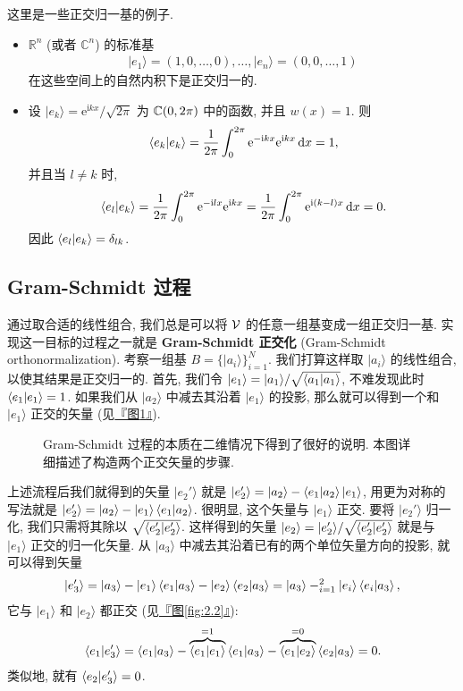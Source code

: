 \documentclass[lang=cn,zihao=-4,twoside,fontset=none]{textbook}
\let\sum\relax
\newcommand{\overnote}[2]{\overset{#1}{\overbrace{#2}}}
\def\eq#1{\[\begin{aligned}{}#1\end{aligned}\]}
\newcommand{\figref}[1]{\hyperref[#1]{『图\textnormal{\ref*{#1}}』}}
\newcommand{\set}[1]{\{#1\}}
\newcommand{\ee}{{\mathrm{e}}}
\newcommand{\ii}{{\mathrm{i}}}
\renewcommand{\dd}{{\mathrm{d}}}
\renewcommand{\ket}[1]{| #1 \rangle}
\begin{document}
\begin{exam}
    \label{eg:2.2.6}%
    这里是一些正交归一基的例子. 
    \begin{itemize}
        \item $\mathbb R^n$ (或者 $\mathbb C^n$) 的标准基 
        \eq{
            \ket{e_1}=(1,0,\dots,0),\dots,\ket{e_n}=(0,0,\dots,1)
        }
        在这些空间上的自然内积下是正交归一的.
        \item 设 $\ket{e_k}=\ee^{\ii kx}/\sqrt{2\pi}$ 为 ${\mathbb C}(0,2\pi)$ 中的函数, 并且 $w(x)=1$. 则 
        \eq{
            \braket{e_k}{e_k}=\frac{1}{2\pi}\int_0^{2\pi} \ee^{-\ii k x} \ee^{\ii k x} \,\dd x = 1,
        }
        并且当 $l\neq k$ 时, 
        \eq{
            \braket{e_l}{e_k}=\frac{1}{2\pi}\int_0^{2\pi}\ee^{-\ii l x}\ee^{\ii k x}=\frac{1}{2\pi}\int_0^{2\pi}\ee^{\ii(k-l)x}\,\dd x=0.
        }
        因此 $\braket{e_l}{e_k}=\delta_{lk}$.
    \end{itemize}
\end{exam}


\newpage
\subsection{Gram-Schmidt 过程}\label{sec:2.2.2}

通过取合适的线性组合, 我们总是可以将 ${\mathcal V}$ 的任意一组基变成一组正交归一基. 实现这一目标的过程之一就是 \textbf{Gram-Schmidt 正交化} (Gram-Schmidt orthonormalization). 考察一组基 $B=\set{\ket{a_i}}_{i=1}^N$. 我们打算这样取 $\ket{a_i}$ 的线性组合, 以使其结果是正交归一的. 首先, 我们令 $\ket{e_1}=\ket{a_1}/\sqrt{\braket{a_1}{a_1}}$, 不难发现此时 $\braket{e_1}{e_1}=1$. 如果我们从 $\ket{a_2}$ 中减去其沿着 $\ket{e_1}$ 的投影, 那么就可以得到一个和 $\ket{e_1}$ 正交的矢量 (见\figref{fig:2.1}).

\begin{figure}[htbp]
    \centering
    
    \caption{Gram-Schmidt 过程的本质在二维情况下得到了很好的说明. 本图详细描述了构造两个正交矢量的步骤.}
    \label{fig:2.1}
\end{figure}

上述流程后我们就得到的矢量 $\ket{e_2'}$ 就是 $\ket{e_2'}=\ket{a_2}-\braket{e_1}{a_2}\ket{e_1}$, 用更为对称的写法就是 $\ket{e_2'}=\ket{a_2}-\ket{e_1}\braket{e_1}{a_2}$. 很明显, 这个矢量与 $\ket{e_1}$ 正交. 要将 $\ket{e_2'}$ 归一化, 我们只需将其除以 $\sqrt{\braket{e_2'}{e_2'}}$. 这样得到的矢量 $\ket{e_2}=\ket{e_2'}/\sqrt{\braket{e_2'}{e_2'}}$ 就是与 $\ket{e_1}$ 正交的归一化矢量. 从 $\ket{a_3}$ 中减去其沿着已有的两个单位矢量方向的投影, 就可以得到矢量 
\eq{
    \ket{e_3'}=\ket{a_3}-\ket{e_1}\braket{e_1}{a_3}-\ket{e_2}\braket{e_2}   {a_3}=\ket{a_3}-\sum_{i=1}^2\ket{e_i}\braket{e_i}{a_3},
}
它与 $\ket{e_1}$ 和 $\ket{e_2}$ 都正交 (见\figref{fig:2.2}):
\eq{
    \braket{e_1}{e_3'}=\braket{e_1}{a_3}-\overnote{=1}{\braket{e_1}{e_1}}\braket{e_1}{a_3}-\overnote{=0}{\braket{e_1}{e_2}}\braket{e_2}{a_3}=0.
}
类似地, 就有 $\braket{e_2}{e_3'}=0$.
\end{document}
